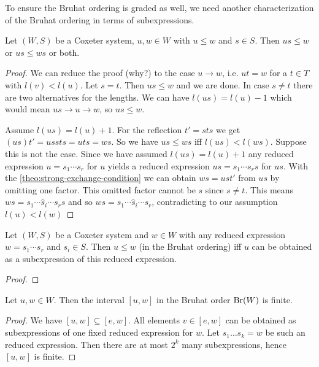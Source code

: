 To ensure the Bruhat ordering is graded as well, we need another characterization of the Bruhat ordering in terms of subexpressions.

\begin{prop}
	Let $(W,S)$ be a Coxeter system, $u,w \in W$ with $u \leq w$ and $s \in S$. Then $us \leq w$ or $us \leq ws$ or both.

	\begin{proof}
		We can reduce the proof (\todo why?) to the case $u \to w$, i.e. $ut = w$ for a $t \in T$ with $l(v) < l(u)$. Let $s = t$. Then $us \leq w$ and we are done. In case $s \neq t$ there are two alternatives for the lengths. We can have $l(us) = l(u) - 1$ which would mean $us \to u \to w$, so $us \leq w$.

		Assume $l(us) = l(u) + 1$. For the reflection $t' = sts$ we get $(us)t' = ussts = uts = ws$. So we have $us \leq ws$ iff $l(us) < l(ws)$. Suppose this is not the case. Since we have assumed $l(us) = l(u) + 1$ any reduced expression $u = s_1 \cdots s_r$ for $u$ yields a reduced expression $us = s_1 \cdots s_r s$ for $us$. With the \ref{theo:strong-exchange-condition} we can obtain $ws = ust'$ from $us$ by omitting one factor. This omitted factor cannot be $s$ since $s \neq t$. This means $ws = s_1 \cdots \hat s_i \cdots s_r s$ and so $ws = s_1 \cdots \hat s_i \cdots s_r$, contradicting to our assumption $l(u) < l(w)$
	\end{proof}
\end{prop}

\begin{theo}
	Let $(W,S)$ be a Coxeter system and $w \in W$ with any reduced expression $w = s_1 \cdots s_r$ and $s_i \in S$. Then $u \leq w$ (in the Bruhat ordering) iff $u$ can be obtained as a subexpression of this reduced expression.

	\begin{proof}
		\todo
	\end{proof}
\end{theo}

\begin{coro}
	Let $u,w \in W$. Then the interval $[u,w]$ in the Bruhat order $\operatorname{Br}(W)$ is finite.

	\begin{proof}
		We have $[u,w] \subseteq [e,w]$. All elements $v \in [e,w]$ can be obtained as subexpressions of one fixed reduced expression for $w$. Let $s_1 \ldots s_k = w$ be such an reduced expression. Then there are at most $2^k$ many subexpressions, hence $[u,w]$ is finite.
	\end{proof}
\end{coro}

